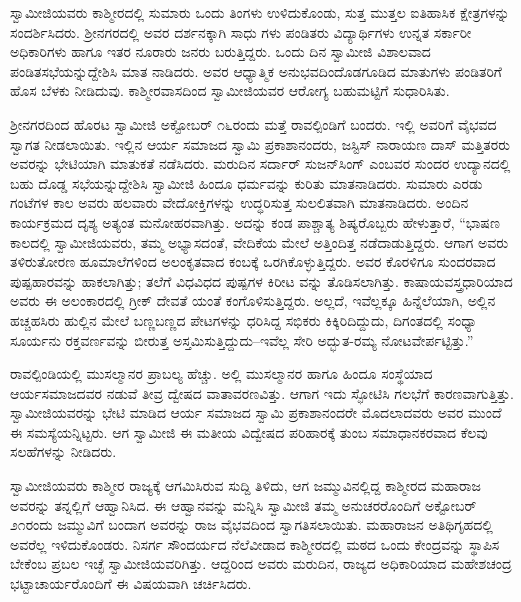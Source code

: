 ಸ್ವಾಮೀಜಿಯವರು ಕಾಶ್ಮೀರದಲ್ಲಿ ಸುಮಾರು ಒಂದು ತಿಂಗಳು ಉಳಿದುಕೊಂಡು, ಸುತ್ತ ಮುತ್ತಲ ಐತಿಹಾಸಿಕ ಕ್ಷೇತ್ರಗಳನ್ನು ಸಂದರ್ಶಿಸಿದರು. ಶ್ರೀನಗರದಲ್ಲಿ ಅವರ ದರ್ಶನಕ್ಕಾಗಿ ಸಾಧು ಗಳು ಪಂಡಿತರು ವಿದ್ಯಾರ್ಥಿಗಳು ಉನ್ನತ ಸರ್ಕಾರೀ ಅಧಿಕಾರಿಗಳು ಹಾಗೂ ಇತರ ನೂರಾರು ಜನರು ಬರುತ್ತಿದ್ದರು. ಒಂದು ದಿನ ಸ್ವಾಮೀಜಿ ವಿಶಾಲವಾದ ಪಂಡಿತಸಭೆಯನ್ನುದ್ದೇಶಿಸಿ ಮಾತ ನಾಡಿದರು. ಅವರ ಆಧ್ಯಾತ್ಮಿಕ ಅನುಭವದಿಂದೊಡಗೂಡಿದ ಮಾತುಗಳು ಪಂಡಿತರಿಗೆ ಹೊಸ ಬೆಳಕು ನೀಡಿದುವು. ಕಾಶ್ಮೀರವಾಸದಿಂದ ಸ್ವಾಮೀಜಿಯವರ ಆರೋಗ್ಯ ಬಹುಮಟ್ಟಿಗೆ ಸುಧಾರಿಸಿತು.

ಶ್ರೀನಗರದಿಂದ ಹೊರಟ ಸ್ವಾಮೀಜಿ ಅಕ್ಟೋಬರ್ ೧೬ರಂದು ಮತ್ತೆ ರಾವಲ್ಪಿಂಡಿಗೆ ಬಂದರು. ಇಲ್ಲಿ ಅವರಿಗೆ ವೈಭವದ ಸ್ವಾಗತ ನೀಡಲಾಯಿತು. ಇಲ್ಲಿನ ಆರ್ಯ ಸಮಾಜದ ಸ್ವಾಮಿ ಪ್ರಕಾಶಾನಂದರು, ಜಸ್ಟಿಸ್ ನಾರಾಯಣ ದಾಸ್ ಮತ್ತಿತರರು ಅವರನ್ನು ಭೇಟಿಯಾಗಿ ಮಾತುಕತೆ ನಡೆಸಿದರು. ಮರುದಿನ ಸರ್ದಾರ್ ಸುಜನ್​ಸಿಂಗ್ ಎಂಬವರ ಸುಂದರ ಉದ್ಯಾನದಲ್ಲಿ ಬಹು ದೊಡ್ಡ ಸಭೆಯನ್ನುದ್ದೇಶಿಸಿ ಸ್ವಾಮೀಜಿ ಹಿಂದೂ ಧರ್ಮವನ್ನು ಕುರಿತು ಮಾತನಾಡಿದರು. ಸುಮಾರು ಎರಡು ಗಂಟೆಗಳ ಕಾಲ ಅವರು ಹಲವಾರು ವೇದೋಕ್ತಿಗಳನ್ನು ಉದ್ಧರಿಸುತ್ತ ಸುಲಲಿತವಾಗಿ ಮಾತನಾಡಿದರು. ಅಂದಿನ ಕಾರ್ಯಕ್ರಮದ ದೃಶ್ಯ ಅತ್ಯಂತ ಮನೋಹರವಾಗಿತ್ತು. ಅದನ್ನು ಕಂಡ ಪಾಶ್ಚಾತ್ಯ ಶಿಷ್ಯರೊಬ್ಬರು ಹೇಳುತ್ತಾರೆ, “ಭಾಷಣ ಕಾಲದಲ್ಲಿ ಸ್ವಾಮೀಜಿಯವರು, ತಮ್ಮ ಅಭ್ಯಾಸದಂತೆ, ವೇದಿಕೆಯ ಮೇಲೆ ಅತ್ತಿಂದಿತ್ತ ನಡೆದಾಡುತ್ತಿದ್ದರು. ಆಗಾಗ ಅವರು ತಳಿರುತೋರಣ ಹೂಮಾಲೆಗಳಿಂದ ಅಲಂಕೃತವಾದ ಕಂಬಕ್ಕೆ ಒರಗಿಕೊಳ್ಳುತ್ತಿದ್ದರು. ಅವರ ಕೊರಳಿಗೂ ಸುಂದರವಾದ ಪುಷ್ಪಹಾರವನ್ನು ಹಾಕಲಾಗಿತ್ತು; ತಲೆಗೆ ವಿಧವಿಧದ ಪುಷ್ಪಗಳ ಕಿರೀಟ ವನ್ನು ತೊಡಿಸಲಾಗಿತ್ತು. ಕಾಷಾಯವಸ್ತ್ರಧಾರಿಯಾದ ಅವರು ಈ ಅಲಂಕಾರದಲ್ಲಿ ಗ್ರೀಕ್ ದೇವತೆ ಯಂತೆ ಕಂಗೊಳಿಸುತ್ತಿದ್ದರು. ಅಲ್ಲದೆ, ಇವೆಲ್ಲಕ್ಕೂ ಹಿನ್ನೆಲೆಯಾಗಿ, ಅಲ್ಲಿನ ಹಚ್ಚಹಸಿರು ಹುಲ್ಲಿನ ಮೇಲೆ ಬಣ್ಣಬಣ್ಣದ ಪೇಟಗಳನ್ನು ಧರಿಸಿದ್ದ ಸಭಿಕರು ಕಿಕ್ಕಿರಿದಿದ್ದುದು, ದಿಗಂತದಲ್ಲಿ ಸಂಧ್ಯಾ ಸೂರ್ಯನು ರಕ್ತವರ್ಣವನ್ನು ಬೀರುತ್ತ ಅಸ್ತಮಿಸುತ್ತಿದ್ದುದು–ಇವೆಲ್ಲ ಸೇರಿ ಅದ್ಭುತ-ರಮ್ಯ ನೋಟವೇರ್ಪಟ್ಟಿತ್ತು.”

ರಾವಲ್ಪಿಂಡಿಯಲ್ಲಿ ಮುಸಲ್ಮಾನರ ಪ್ರಾಬಲ್ಯ ಹೆಚ್ಚು. ಅಲ್ಲಿ ಮುಸಲ್ಮಾನರ ಹಾಗೂ ಹಿಂದೂ ಸಂಸ್ಥೆಯಾದ ಆರ್ಯಸಮಾಜದವರ ನಡುವೆ ತೀವ್ರ ದ್ವೇಷದ ವಾತಾವರಣವಿತ್ತು. ಆಗಾಗ ಇದು ಸ್ಫೋಟಿಸಿ ಗಲಭೆಗೆ ಕಾರಣವಾಗುತ್ತಿತ್ತು. ಸ್ವಾಮೀಜಿಯವರನ್ನು ಭೇಟಿ ಮಾಡಿದ ಆರ್ಯ ಸಮಾಜದ ಸ್ವಾಮಿ ಪ್ರಕಾಶಾನಂದರೇ ಮೊದಲಾದವರು ಅವರ ಮುಂದೆ ಈ ಸಮಸ್ಯೆಯನ್ನಿಟ್ಟರು. ಆಗ ಸ್ವಾಮೀಜಿ ಈ ಮತೀಯ ವಿದ್ವೇಷದ ಪರಿಹಾರಕ್ಕೆ ತುಂಬ ಸಮಾಧಾನಕರವಾದ ಕೆಲವು ಸಲಹೆಗಳನ್ನು ನೀಡಿದರು.

ಸ್ವಾಮೀಜಿಯವರು ಕಾಶ್ಮೀರ ರಾಜ್ಯಕ್ಕೆ ಆಗಮಿಸಿರುವ ಸುದ್ದಿ ತಿಳಿದು, ಆಗ ಜಮ್ಮುವಿನಲ್ಲಿದ್ದ ಕಾಶ್ಮೀರದ ಮಹಾರಾಜ ಅವರನ್ನು ತನ್ನಲ್ಲಿಗೆ ಆಹ್ವಾನಿಸಿದ. ಈ ಆಹ್ವಾನವನ್ನು ಮನ್ನಿಸಿ ಸ್ವಾಮೀಜಿ ತಮ್ಮ ಅನುಚರರೊಂದಿಗೆ ಅಕ್ಟೋಬರ್ ೨೧ರಂದು ಜಮ್ಮುವಿಗೆ ಬಂದಾಗ ಅವರನ್ನು ರಾಜ ವೈಭವದಿಂದ ಸ್ವಾಗತಿಸಲಾಯಿತು. ಮಹಾರಾಜನ ಅತಿಥಿಗೃಹದಲ್ಲಿ ಅವರೆಲ್ಲ ಇಳಿದುಕೊಂಡರು. ನಿಸರ್ಗ ಸೌಂದರ್ಯದ ನೆಲೆವೀಡಾದ ಕಾಶ್ಮೀರದಲ್ಲಿ ಮಠದ ಒಂದು ಕೇಂದ್ರವನ್ನು ಸ್ಥಾಪಿಸ ಬೇಕೆಂಬ ಪ್ರಬಲ ಇಚ್ಛೆ ಸ್ವಾಮೀಜಿಯವರಿಗಿತ್ತು. ಆದ್ದರಿಂದ ಅವರು ಮರುದಿನ, ರಾಜ್ಯದ ಅಧಿಕಾರಿಯಾದ ಮಹೇಶಚಂದ್ರ ಭಟ್ಟಾಚಾರ್ಯರೊಂದಿಗೆ ಈ ವಿಷಯವಾಗಿ ಚರ್ಚಿಸಿದರು.

